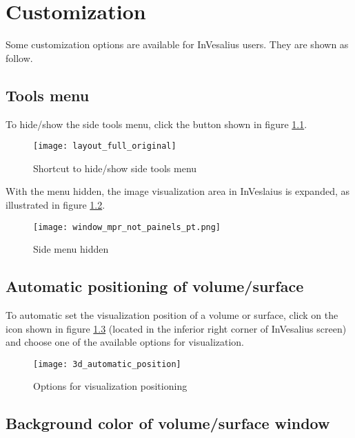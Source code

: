 \chapter{Customization}

Some customization options are available for InVesalius users. They are shown as follow.

\section{Tools menu}

To hide/show the side tools menu, click the button shown in figure
\ref{fig:layout_full_original}.

\begin{figure}[!htb]
\centering
\texttt{[image: layout\_full\_original]}
\caption{Shortcut to hide/show side tools menu}
\label{fig:layout_full_original}
\end{figure}

With the menu hidden, the image visualization area in InVeslaius is expanded, as illustrated in figure \ref{fig:closed_tool_menu}.

\begin{figure}[!htb]
\centering
\texttt{[image: window\_mpr\_not\_painels\_pt.png]}
\caption{Side menu hidden}
\label{fig:closed_tool_menu}
\end{figure}

\newpage

\section{Automatic positioning of volume/surface}

To automatic set the visualization position of a volume or surface,
click on the icon shown in figure \ref{fig:3d_automatic_position}
(located in the inferior right corner of InVesalius screen) and choose one of the available options for visualization.

\begin{figure}[!htb]
\centering
\texttt{[image: 3d\_automatic\_position]}
\caption{Options for visualization positioning}
\label{fig:3d_automatic_position}
\end{figure}

\section{Background color of volume/surface window}

